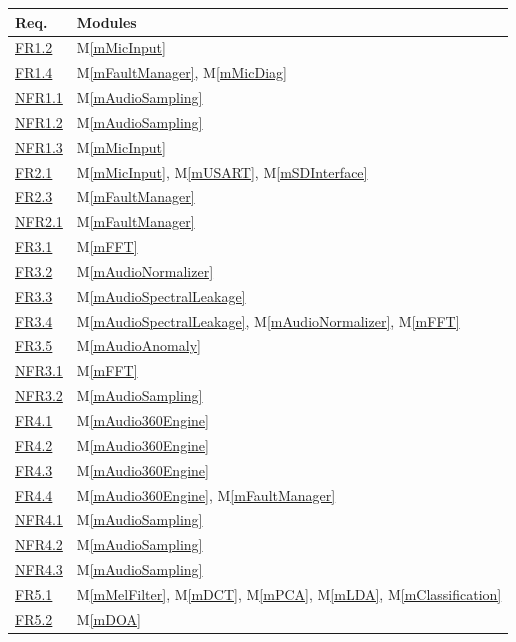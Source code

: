 \documentclass[12pt, titlepage]{article}
\newcommand{\mref}[1]{M\ref{#1}}
\begin{document}
\begin{longtable}{p{} p{}}
\toprule
\textbf{Req.} & \textbf{Modules}\\
\midrule
\hyperref[SRS-FR1_2]{FR1.2} & \mref{mMicInput}\\
\hyperref[SRS-FR1_4]{FR1.4} & \mref{mFaultManager}, \mref{mMicDiag}\\
\hyperref[SRS-NFR1_1]{NFR1.1} & \mref{mAudioSampling} \\
\hyperref[SRS-NFR1_2]{NFR1.2} & \mref{mAudioSampling}\\
\hyperref[SRS-NFR1_3]{NFR1.3} & \mref{mMicInput}\\
\hline
\hyperref[SRS-FR2_1]{FR2.1} & \mref{mMicInput}, \mref{mUSART},
  \mref{mSDInterface} \\
\hyperref[SRS-FR2_3]{FR2.3} & \mref{mFaultManager} \\
\hyperref[SRS-NFR2_1]{NFR2.1} & \mref{mFaultManager} \\
\hline
\hyperref[SRS-FR3_1]{FR3.1} & \mref{mFFT} \\
\hyperref[SRS-FR3_2]{FR3.2} & \mref{mAudioNormalizer} \\
\hyperref[SRS-FR3_3]{FR3.3} & \mref{mAudioSpectralLeakage} \\
\hyperref[SRS-FR3_4]{FR3.4} & \mref{mAudioSpectralLeakage},
  \mref{mAudioNormalizer}, \mref{mFFT} \\
\hyperref[SRS-FR3_5]{FR3.5} & \mref{mAudioAnomaly} \\
\hyperref[SRS-NFR3_1]{NFR3.1} & \mref{mFFT} \\
\hyperref[SRS-NFR3_2]{NFR3.2} & \mref{mAudioSampling} \\
\hline
\hyperref[SRS-FR4_1]{FR4.1} & \mref{mAudio360Engine} \\
\hyperref[SRS-FR4_2]{FR4.2} & \mref{mAudio360Engine} \\
\hyperref[SRS-FR4_3]{FR4.3} & \mref{mAudio360Engine} \\
\hyperref[SRS-FR4_4]{FR4.4} & \mref{mAudio360Engine}, \mref{mFaultManager} \\
\hyperref[SRS-NFR4_1]{NFR4.1} & \mref{mAudioSampling} \\
\hyperref[SRS-NFR4_2]{NFR4.2} & \mref{mAudioSampling} \\
\hyperref[SRS-NFR4_3]{NFR4.3} & \mref{mAudioSampling} \\
\hline
\hyperref[SRS-FR5_1]{FR5.1} & \mref{mMelFilter}, \mref{mDCT}, \mref{mPCA},
\mref{mLDA}, \mref{mClassification}\\
\hyperref[SRS-FR5_2]{FR5.2} & \mref{mDOA} \\

\end{longtable}
\end{document}
